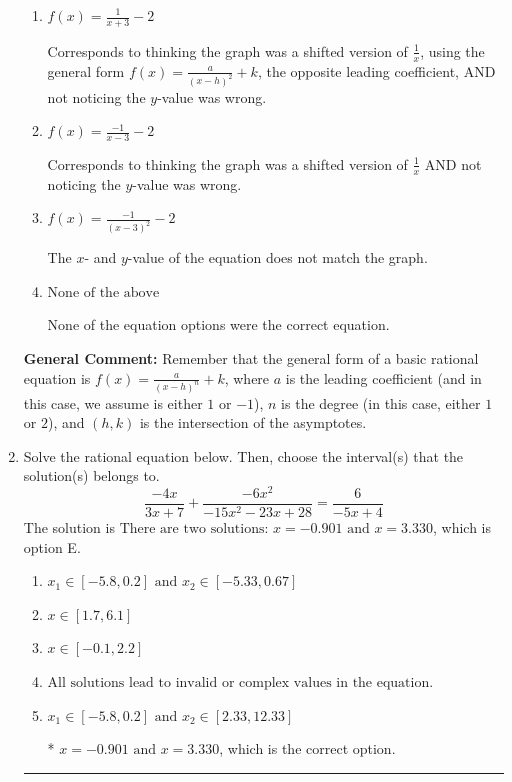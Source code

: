 \documentclass{extbook}[14pt]
\newcommand{\litem}[1]{\item #1

\rule{\textwidth}{0.4pt}}
\begin{document}
\begin{enumerate}
{\begin{enumerate}[label=\Alph*.]
Corresponds to using the general form $f(x) = \frac{a}{(x-h)^2}+k$, the opposite leading coefficient, AND not noticing the $y$-value was wrong.
\item \( f(x) = \frac{1}{x + 3} - 2 \)

Corresponds to thinking the graph was a shifted version of $\frac{1}{x}$, using the general form $f(x) = \frac{a}{(x-h)^2}+k$, the opposite leading coefficient, AND not noticing the $y$-value was wrong.
\item \( f(x) = \frac{-1}{x - 3} - 2 \)

Corresponds to thinking the graph was a shifted version of $\frac{1}{x}$ AND not noticing the $y$-value was wrong.
\item \( f(x) = \frac{-1}{(x - 3)^2} - 2 \)

The $x$- and $y$-value of the equation does not match the graph.
\item \( \text{None of the above} \)

None of the equation options were the correct equation.
\end{enumerate}

\textbf{General Comment:} Remember that the general form of a basic rational equation is $ f(x) = \frac{a}{(x-h)^n} + k$, where $a$ is the leading coefficient (and in this case, we assume is either $1$ or $-1$), $n$ is the degree (in this case, either $1$ or $2$), and $(h, k)$ is the intersection of the asymptotes.
}
\litem{
Solve the rational equation below. Then, choose the interval(s) that the solution(s) belongs to.
\[ \frac{-4x}{3x + 7} + \frac{-6x^{2}}{-15x^{2} -23 x + 28} = \frac{6}{-5x + 4} \]The solution is \( \text{There are two solutions: } x = -0.901 \text{ and } x = 3.330 \), which is option E.\begin{enumerate}[label=\Alph*.]
\item \( x_1 \in [-5.8, 0.2] \text{ and } x_2 \in [-5.33,0.67] \)


\item \( x \in [1.7,6.1] \)


\item \( x \in [-0.1,2.2] \)


\item \( \text{All solutions lead to invalid or complex values in the equation.} \)


\item \( x_1 \in [-5.8, 0.2] \text{ and } x_2 \in [2.33,12.33] \)

* $x = -0.901 \text{ and } x = 3.330$, which is the correct option.
\end{enumerate}

}
\end{enumerate}
\end{document}
